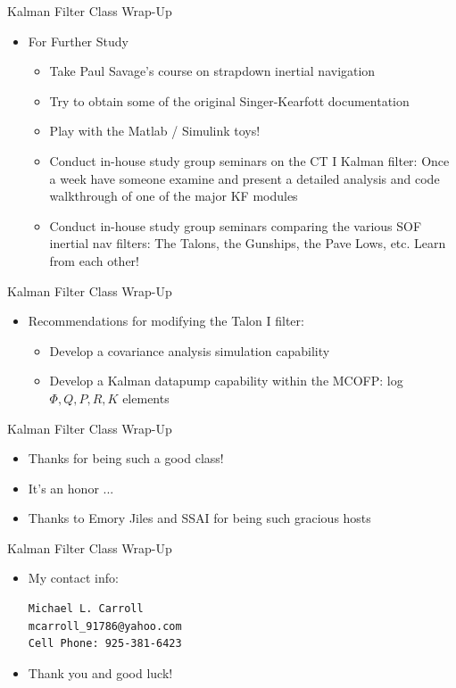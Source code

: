 \begin{frame}
Kalman Filter Class Wrap-Up
\begin{itemize}
  \item For Further Study
	\begin{itemize}
		\item Take Paul Savage's course on strapdown inertial navigation
		\item Try to obtain some of the original Singer-Kearfott documentation
		\item Play with the Matlab / Simulink toys!
		\item Conduct in-house study group seminars on the CT I Kalman filter: Once a week have someone examine and present a detailed analysis and code walkthrough of one of the major KF modules
		\item Conduct in-house study group seminars comparing the various SOF inertial nav filters: The Talons, the Gunships, the Pave Lows, etc.  Learn from each other!
	\end{itemize}
\end{itemize} 
\end{frame}

\begin{frame}
Kalman Filter Class Wrap-Up
\begin{itemize}
  \item Recommendations for modifying the Talon I filter:
	\begin{itemize}
		\item Develop a covariance analysis simulation capability
		\item Develop a Kalman datapump capability within the MCOFP:  log $\Phi,Q,P,R,K$ elements
	\end{itemize}
\end{itemize} 
\end{frame}

\begin{frame}
Kalman Filter Class Wrap-Up
\begin{itemize}
  \item Thanks for being such a good class!
  \item It's an honor ...
  \item Thanks to Emory Jiles and SSAI for being such gracious hosts
\end{itemize} 
\end{frame}

\begin{frame}
Kalman Filter Class Wrap-Up
\begin{itemize}
   \item My contact info:
\begin{verbatim}
Michael L. Carroll
mcarroll_91786@yahoo.com
Cell Phone: 925-381-6423
\end{verbatim}
  \item Thank you and good luck!
\end{itemize} 
\end{frame}


